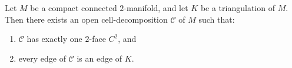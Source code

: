 Let $M$ be a compact connected $2$-manifold, and let $K$ be a triangulation of $M$. Then there exists an open cell-decomposition $\mathcal{C}$ of $M$ such that:
\begin{enumerate}
\item $\mathcal{C}$ has exactly one $2$-face $C^2$, and
\item every edge of $\mathcal{C}$ is an edge of $K$.
\end{enumerate}
